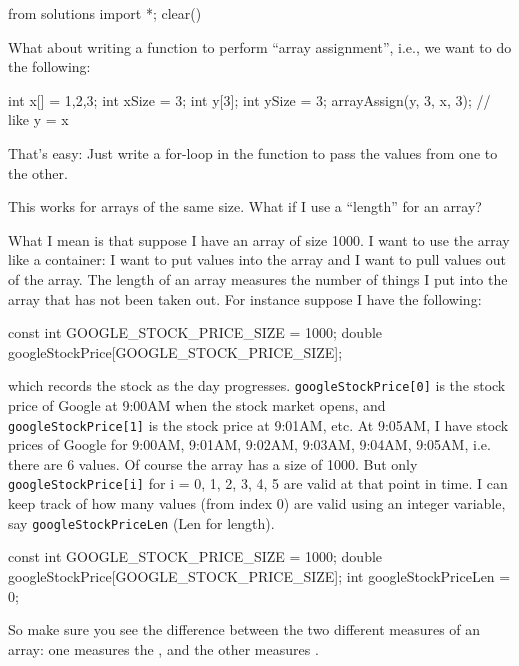 \begin{python0}
from solutions import *; clear()
\end{python0}

What about writing a function to perform ``array assignment'', i.e., we want to do the following:

\begin{consolethree}[escapeinside=||]
int x[] = {1,2,3};
int xSize = 3;
int y[3];
int ySize = 3;
arrayAssign(y, 3, x, 3); // like y = x
\end{consolethree}

That's easy: Just write a for-loop in the function to pass the values from one to the other.

This works for arrays of the same size. What if I use a ``length'' for an array?

What I mean is that suppose I have an array of size 1000. I want to use the array like a container: I want to put values into the array and I want to pull values out of the array. The length of an array measures the number of things I put into the array that has not been taken out. For instance suppose I have the following:

\begin{consolethree}[escapeinside=||]
const int GOOGLE_STOCK_PRICE_SIZE = 1000;
double googleStockPrice[GOOGLE_STOCK_PRICE_SIZE];
\end{consolethree}

which records the stock as the day progresses. \texttt{googleStockPrice[0]} is the stock price of Google at 9:00AM when the stock market opens, and \texttt{googleStockPrice[1]} is the stock price at 9:01AM, etc. At 9:05AM, I have stock prices of Google for 9:00AM, 9:01AM, 9:02AM, 9:03AM, 9:04AM, 9:05AM, i.e. there are 6 values. Of course the array has a size of 1000. But only \texttt{googleStockPrice[i]} for i = 0, 1, 2, 3, 4, 5 are valid at that point in time. I can keep track of how many values (from index 0) are valid using an integer variable, say \texttt{googleStockPriceLen} (Len for length).

\begin{consolethree}[escapeinside=||]
const int GOOGLE_STOCK_PRICE_SIZE = 1000;
double googleStockPrice[GOOGLE_STOCK_PRICE_SIZE];
int googleStockPriceLen = 0;
\end{consolethree}

So make sure you see the difference between the two different measures of an array: one measures the , and the other measures .

